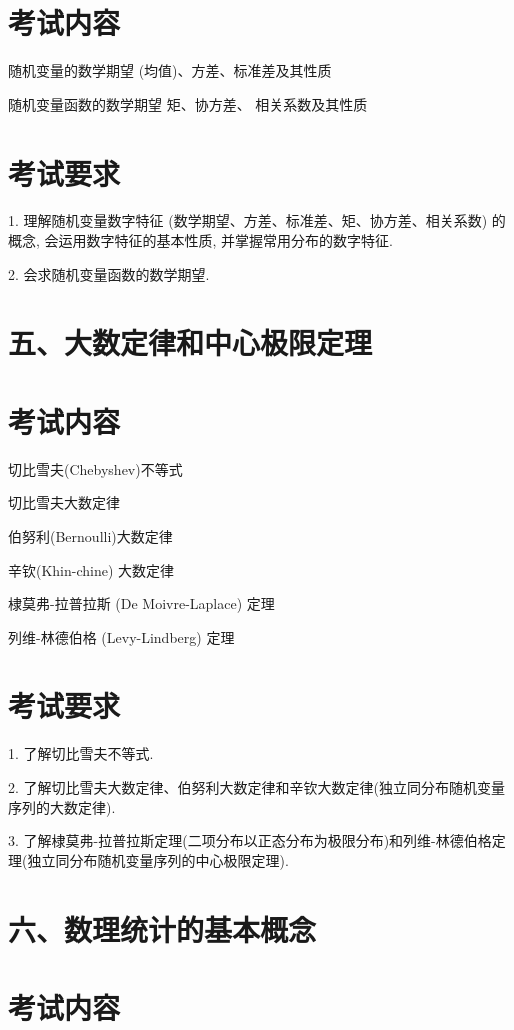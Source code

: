 \documentclass[10pt]{article}
\begin{document}
\section*{考试内容}

随机变量的数学期望 (均值)、方差、标准差及其性质 

随机变量函数的数学期望 矩、协方差、 相关系数及其性质

\section*{考试要求}

1. 理解随机变量数字特征 (数学期望、方差、标准差、矩、协方差、相关系数) 的概念, 会运用数字特征的基本性质, 并掌握常用分布的数字特征.

2. 会求随机变量函数的数学期望.

\section*{五、大数定律和中心极限定理}

\section*{考试内容}

切比雪夫(Chebyshev)不等式 

切比雪夫大数定律 

伯努利(Bernoulli)大数定律 

辛钦(Khin-chine) 大数定律 

棣莫弗-拉普拉斯 (De Moivre-Laplace) 定理 

列维-林德伯格 (Levy-Lindberg) 定理

\section*{考试要求}

1. 了解切比雪夫不等式.

2. 了解切比雪夫大数定律、伯努利大数定律和辛钦大数定律(独立同分布随机变量序列的大数定律).

3. 了解棣莫弗-拉普拉斯定理(二项分布以正态分布为极限分布)和列维-林德伯格定理(独立同分布随机变量序列的中心极限定理).

\section*{六、数理统计的基本概念}

\section*{考试内容}
\end{document}
